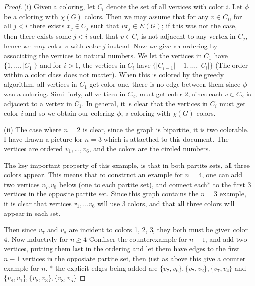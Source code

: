 \documentclass{article}
\begin{document}
	    \begin{proof}
		    (i) Given a coloring, let $C_i$ denote the set of all vertices with color $i$. 
		    Let $\phi$ be a coloring with $\chi (G)$ colors. Then we may assume that for any $v \in C_i$, for all $j < i$ there exists 
		    $x_j \in C_j$ such that $v x_j \in E(G)$; if this was not the case, then there exists some $j < i$ such that $v \in C_i$ is 
		    not adjacent to any vertex in $C_j$, hence we may color $v$ with color $j$ instead. 
		    Now we give an ordering by associating the vertices to natural numbers. We let the vertices in $C_1$ have $\{1, \dots , |C_1| \}$ 
		    and for $i > 1$, the vertices in $C_i$ have $\{|C_{i-1}| + 1, \dots, |C_{i}| \}$ (The order within a color class does not matter). 
		    When this is colored by the greedy algorithm, all vertices in $C_1$ get color one, there is no edge between them since $\phi$ was 
		    a coloring. Similliarly, all vertices in $C_2$, must get color $2$, since each $v \in C_2$ is adjacent to a vertex in $C_1$. 
		    In general, it is clear that the vertices in $C_i$ must get color $i$ and so we obtain our coloring 
		    $\phi$, a coloring with $\chi(G)$ colors. 

		    (ii) The case where $n=2$ is clear, since the graph is bipartite, it is two colorable. I have drawn a picture for $n = 3$ 
		    which is attacthed to this document. The vertices are ordered $v_1, \dots, v_6$, and the colors are the circled numbers. 

		    The key important property of this example, is that in both partite sets, all three colors appear.  
		    This means that to construct an example for $n = 4$, one can add two vertices $v_7, v_8$
		  below (one to each partite set), and connect each* to the 
		    first 3 vertices in the opposite partite set. Since this graph contains 
		    the $n=3$ example, it is clear that vertices $v_1, \dots v_6$ will use 3 colors, and that all three colors will appear in each set. 
		    
		    Then since $v_7$ and $v_8$ are incident to colors 
		    1, 2, 3, they both must be given color $4$. Now inductivly for $n \geq 4$ Condiser the counterexample for $n-1$, and add two vertices, 
		    putting them last in the ordering and let them have edges to the first $n-1$ vertices in the opposiate partite set, then just as above 
		    this give a counter example for $n$. \newline 
		    * the explicit edges being added are 
		    $\{v_7, v_6\}, \{v_7, v_2\}, \{v_7, v_4\} $ and 
		    $\{v_8, v_1\}, \{v_8, v_3\}, \{v_8, v_5\}$
	    \end{proof}
\end{document}
